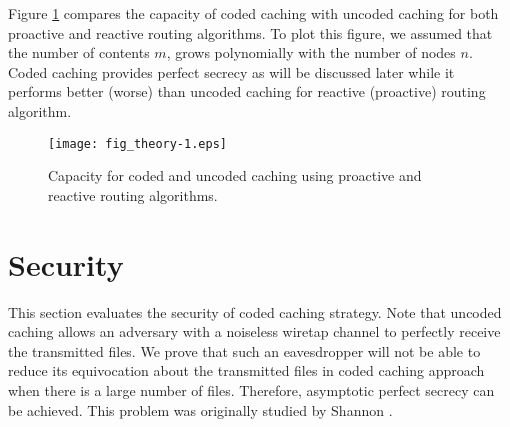\documentclass[10pt,journal]{IEEEtran}
\begin{document}
Figure \ref{fig_theory} compares the capacity of coded caching with uncoded caching for both proactive and reactive routing algorithms. To plot this figure, we assumed that the number of contents $m$, grows polynomially with the number of nodes $n$. 
Coded caching provides perfect secrecy as will be discussed later while it performs better (worse) than uncoded caching for reactive (proactive) routing algorithm. 
\begin{figure}[http]
    \center
      \texttt{[image: fig\_theory-1.eps]}
\caption{Capacity for coded and uncoded caching using proactive and reactive routing algorithms.} 
\label{fig_theory}
\end{figure}





\section{Security} 
\label{security_sec}
 This section evaluates the security of  coded caching strategy. Note that uncoded caching allows an adversary with a noiseless wiretap channel to perfectly receive the transmitted files. We prove that such an eavesdropper will not be able to reduce its   equivocation about the transmitted files in coded caching approach when there is a large number of files. Therefore, asymptotic perfect secrecy can be achieved. This problem was originally studied by Shannon \cite{shannon1949communication}.
 
\end{document}
